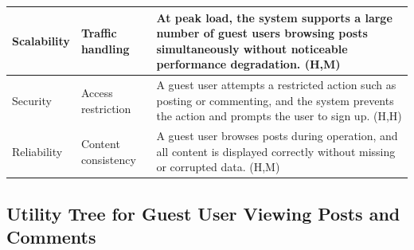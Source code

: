 \documentclass{article}
\begin{document}
\begin{table}[H]
\begin{tabular}{|p{3cm}|p{4cm}|p{7cm}|}
        Scalability
                                   & Traffic handling
                                   & At peak load, the system supports a large number of guest users browsing posts simultaneously without noticeable performance degradation. (H,M)                   \\
        \hline

        Security
                                   & Access restriction
                                   & A guest user attempts a restricted action such as posting or commenting, and the system prevents the action and prompts the user to sign up. (H,H)                \\
        \hline

        Reliability
                                   & Content consistency
                                   & A guest user browses posts during operation, and all content is displayed correctly without missing or corrupted data. (H,M)                                      \\
        \hline
    \end{tabular}
\end{table}

\subsection{Utility Tree for Guest User Viewing Posts and Comments}
\end{document}
